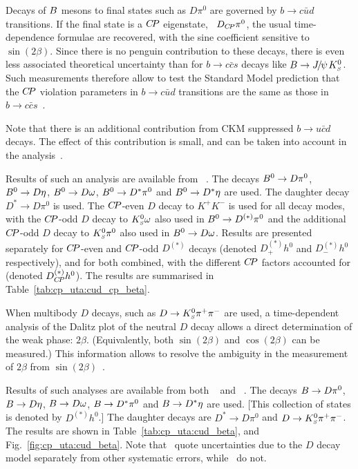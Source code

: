\clearpage
{}
\label{sec:cp_uta:cud_beta}

Decays of $B$ mesons to final states such as $D\pi^0$ are 
governed by $b \to c\bar{u}d$ transitions. 
If the final state is a $C\!P$ eigenstate, \eg\ $D_{C\!P}\pi^0$, 
the usual time-dependence formulae are recovered, 
with the sine coefficient sensitive to $\sin(2\beta)$. 
Since there is no penguin contribution to these decays, 
there is even less associated theoretical uncertainty 
than for $b \to c\bar{c}s$ decays like $B \to {J\mskip -3mu/\mskip -2mu\psi\mskip 2mu} K^0_{\scriptscriptstyle S}$.
Such measurements therefore allow to test the Standard Model prediction
that the $C\!P$ violation parameters in $b \to c\bar{u}d$ transitions
are the same as those in $b \to c\bar{c}s$~\cite{Grossman:1996ke}.

Note that there is an additional contribution from CKM suppressed
$b \to u \bar{c} d$ decays.
The effect of this contribution is small, and can be taken into 
account in the analysis~\cite{Fleischer:2003ai,Fleischer:2003aj}.

Results of such an analysis are available from \babar~\cite{Aubert:2007mn}.
The decays $B^0 \to D\pi^0$, $B^0 \to D\eta$, $B^0 \to D\omega$,
$B^0 \to D^*\pi^0$ and $B^0 \to D^*\eta$ are used.
The daughter decay $D^* \to D\pi^0$ is used.
The $C\!P$-even $D$ decay to $K^+K^-$ is used for all decay modes,
with the $C\!P$-odd $D$ decay to $K^0_{\scriptscriptstyle S}\omega$ also used in $B^0 \to D^{(*)}\pi^0$
and the additional $C\!P$-odd $D$ decay to $K^0_{\scriptscriptstyle S}\pi^0$ 
also used in $B^0 \to D\omega$.
Results are presented separately for $C\!P$-even and $C\!P$-odd 
$D^{(*)}$ decays (denoted $D^{(*)}_+ h^0$ and $D^{(*)}_- h^0$ respectively),
and for both combined, with the different $C\!P$ factors accounted for
(denoted $D^{(*)}_{C\!P} h^0$).
The results are summarised in Table~\ref{tab:cp_uta:cud_cp_beta}.



When multibody $D$ decays, such as $D \to K^0_{\scriptscriptstyle S}\pi^+\pi^-$ are used, 
a time-dependent analysis of the Dalitz plot of the neutral $D$ decay 
allows a direct determination of the weak phase: $2\beta$. 
(Equivalently, both $\sin(2\beta)$ and $\cos(2\beta)$ can be measured.)
This information allows to resolve the ambiguity in the 
measurement of $2\beta$ from $\sin(2\beta)$~\cite{Bondar:2005gk}.

Results of such analyses are available from both 
\belle~\cite{Krokovny:2006sv} and \babar~\cite{Aubert:2007rp}.
The decays $B \to D\pi^0$, $B \to D\eta$, $B \to D\omega$, 
$B \to D^*\pi^0$ and $B \to D^*\eta$ are used. 
[This collection of states is denoted by $D^{(*)}h^0$.]
The daughter decays are $D^* \to D\pi^0$ and $D \to K^0_{\scriptscriptstyle S}\pi^+\pi^-$.
The results are shown in Table~\ref{tab:cp_uta:cud_beta},
and Fig.~\ref{fig:cp_uta:cud_beta}.
Note that \babar\ quote uncertainties due to the $D$ decay model 
separately from other systematic errors, while \belle\ do not.

